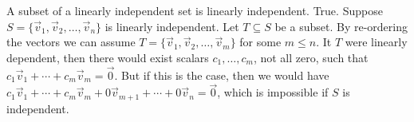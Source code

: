 {A subset of a linearly independent set is linearly independent.}
{True. Suppose $S=\{\vec{v}_1,\vec{v}_2,\ldots, \vec{v}_n\}$ is linearly independent. Let $T\subseteq S$ be a subset. By re-ordering the vectors we can assume $T=\{\vec{v}_1,\vec{v}_2,\ldots, \vec{v}_m\}$ for some $m\leq n$. It $T$ were linearly dependent, then there would exist scalars $c_1,\ldots, c_m$, not all zero, such that $c_1\vec{v}_1+\cdots +c_m\vec{v}_m=\vec{0}$. But if this is the case, then we would have $c_1\vec{v}_1+\cdots +c_m\vec{v}_m+0\vec{v}_{m+1}+\cdots +0\vec{v}_n=\vec{0}$, which is impossible if $S$ is independent.}